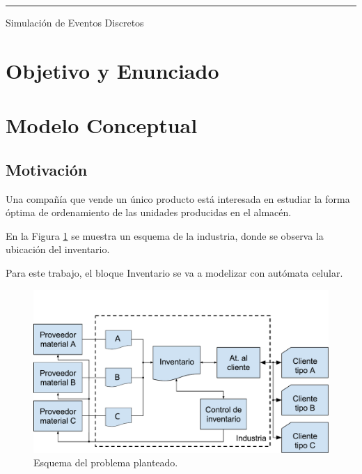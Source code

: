 \documentclass[10pt]{article}
\begin{document}
\begin{titlepage}
\vfill

\hrule
\vspace{0.2cm}

\noindent\small{Simulación de Eventos Discretos}

\end{titlepage}

%
%
\setcounter{page}{1}

%
%
\tableofcontents
\newpage

%
%

\section{Objetivo y Enunciado}

\section{Modelo Conceptual}
\subsection{Motivación\label{sec:motivacion}}

Una compañía que vende un único producto está interesada en estudiar la forma óptima de ordenamiento de las unidades producidas en el almacén.

En la Figura \ref{fig:esquema-del-problema} se muestra un esquema de la industria, donde se observa la ubicación del inventario.

Para este trabajo, el bloque Inventario se va a modelizar con autómata celular.

\begin{figure}[h]
\centering
\includegraphics[width=\textwidth]{img/figura1}
\caption{Esquema del problema planteado.}
\label{fig:esquema-del-problema}
\end{figure}
\FloatBarrier 
\end{document}

